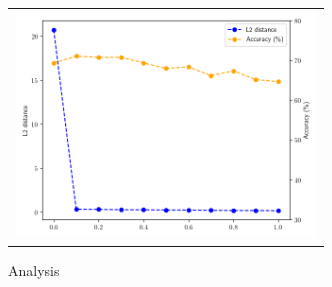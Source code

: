 \begin{figure}[t]
	\centering
	\footnotesize
	\begin{tabular}{c}
		\includegraphics[width=8cm]{figures/analysis.png}
	\end{tabular}
	\caption{Analysis}\label{fig:analysis}
\end{figure}